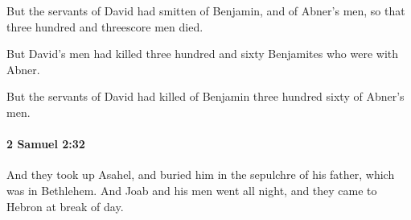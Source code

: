 			\begin{versebox}
					\item[BHS] 
					\item[ASV] But the servants of David had smitten of Benjamin, and of Abner's men, so that three hundred and threescore men died.
					\item[NIV] But David’s men had killed three hundred and sixty Benjamites who were with Abner.
					\item[NRSV] But the servants of David had killed of Benjamin three hundred sixty of Abner’s men.
			\end{versebox}

		\paragraph{2 Samuel 2:32} %
			\label{2SAMUEL-2-32}

			And they took up Asahel, and buried him in the sepulchre of his father, which was in Bethlehem. And Joab and his men went all night, and they came to Hebron at break of day.

